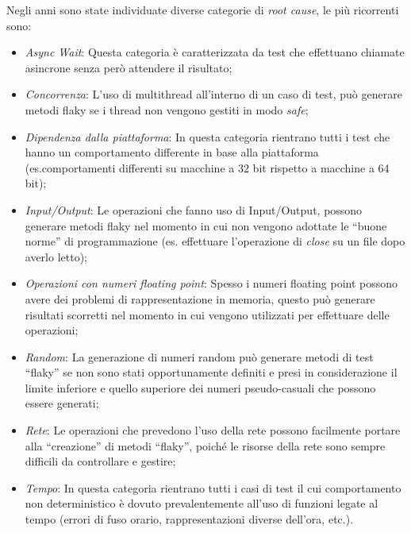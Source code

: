 Negli anni sono state individuate diverse categorie di \emph{root cause}, le più ricorrenti sono\cite{luo2014empirical}:
\begin{itemize}
	\item \emph{Async Wait}: Questa categoria è caratterizzata da test che effettuano chiamate
	asincrone senza però attendere il risultato;
	\item \emph{Concorrenza}: L’uso di multithread all’interno di un caso di test, può
	generare metodi flaky se i thread non vengono gestiti in modo \emph{safe};
	\item \emph{Dipendenza dalla piattaforma}: In questa categoria rientrano tutti i test che
	hanno un comportamento differente in base alla piattaforma (es.comportamenti differenti su macchine a 32 bit rispetto a macchine a 64 bit);
	\item \emph{Input/Output}: Le operazioni che fanno uso di Input/Output, possono generare metodi flaky nel momento in cui non vengono adottate le “buone norme” di programmazione (es. effettuare l’operazione di \emph{close} su un file dopo averlo letto);
	\item \emph{Operazioni con numeri floating point}: Spesso i numeri floating point possono avere dei problemi di rappresentazione in memoria, questo può
	generare risultati scorretti nel momento in cui vengono utilizzati per effettuare delle operazioni;
	\item \emph{Random}: La generazione di numeri random può generare metodi di test
	“flaky” se non sono stati opportunamente definiti e presi in considerazione il limite inferiore e quello superiore dei numeri pseudo-casuali che possono essere generati;
	\item \emph{Rete}: Le operazioni che prevedono l’uso della rete possono facilmente portare alla “creazione” di metodi “flaky”, poiché le risorse della rete sono sempre difficili da controllare e gestire;
	\item \emph{Tempo}: In questa categoria rientrano tutti i casi di test il cui comportamento non deterministico è dovuto prevalentemente all’uso di funzioni legate al
	tempo (errori di fuso orario, rappresentazioni diverse dell’ora, etc.).
\end{itemize}

